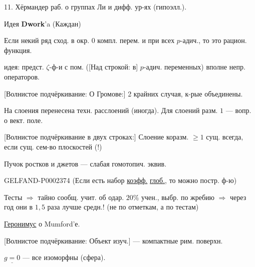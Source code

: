 11. Хёрмандер \quad раб. о группах Ли и дифф. ур-ях (гипоэлл.).



Идея \textbf{Dwork}'a (Каждан)



Если некий ряд сход. в окр. $0$ компл. перем. и при всех $p$-адич., то это рацион. функция.



идея: предст. $\zeta$-ф-и с пом. ([Над строкой: в] $p$-адич. переменных) вполне непр. операторов.



[Волнистое подчёркивание: О Громове:] 2 крайних случая, к-рые объединены.



На слоения перенесена техн. расслоений (иногда). Для слоений разм. $1$ — вопр. о вект. поле.



[Волнистое подчёркивание в двух строках:]
Слоение коразм. $\geq1$ сущ. всегда, если сущ. сем-во плоскостей (!)



Пучок ростков и джетов — слабая гомотопич. эквив.



\begin{GelfandAdjacentEvidence}{GELFAND-P000237}{4}
(Если есть набор \underline{коэфф.} \underline{глоб.}, то можно постр. ф-ю)



\end{GelfandAdjacentEvidence}

Тесты $\Rightarrow$ тайно сообщ. учит. об одар. $20\%$ учен., выбр. по жребию $\Rightarrow$ через год они в $1{,}5$ раза лучше средн.! (не по отметкам, а по тестам)





\underline{\underline{Геронимус}} о Mumford'е.



[Волнистое подчёркивание: Объект изуч.] — компактные рим. поверхн.



$\underline{g=0}$ — все изоморфны (сфера).



